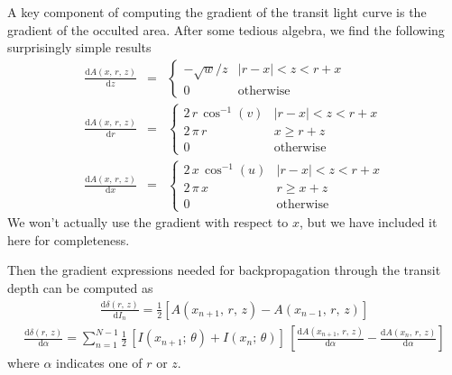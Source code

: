 \documentclass[modern]{aastex62}
\newcommand{\dd}{\ensuremath{ \mathrm{d}}}
\begin{document}
A key component of computing the gradient of the transit light curve is the
gradient of the occulted area.
After some tedious algebra, we find the following surprisingly simple results
\begin{eqnarray}
\frac{\dd A(x,\,r,\,z)}{\dd z} &=& \left\{\begin{array}{ll}
-\sqrt{w}/z &
    \left|r-x\right| < z < r + x \\
0 & \mathrm{otherwise}
\end{array}\right.\\
\frac{\dd A(x,\,r,\,z)}{\dd r} &=& \left\{\begin{array}{ll}
2\,r\,\cos^{-1}(v) & \left|r-x\right| < z < r + x \\
2\,\pi\,r & x \ge r + z \\
0 & \mathrm{otherwise}
\end{array}\right.\\
\frac{\dd A(x,\,r,\,z)}{\dd x} &=& \left\{\begin{array}{ll}
2\,x\,\cos^{-1}(u) & \left|r-x\right| < z < r + x \\
2\,\pi\,x & r \ge x + z \\
0 & \mathrm{otherwise}
\end{array}\right.
\end{eqnarray}
We won't actually use the gradient with respect to $x$, but we have included
it here for completeness.

Then the gradient expressions needed for backpropagation through the transit
depth can be computed as
\begin{eqnarray}
\frac{\dd \delta(r,\,z)}{\dd I_n} = \frac{1}{2}
    \left[A(x_{n+1},\,r,\,z) - A(x_{n-1},\,r,\,z)\right]
\end{eqnarray}
\begin{eqnarray}
\frac{\dd \delta(r,\,z)}{\dd \alpha} = \sum_{n=1}^{N-1} \frac{1}{2}\,\left[
I(x_{n+1};\,\theta) + I(x_n;\,\theta)\right]\,
\left[\frac{\dd A(x_{n+1},\,r,\,z)}{\dd\alpha} -
\frac{\dd A(x_n,\,r,\,z)}{\dd \alpha}\right]
\end{eqnarray}
where $\alpha$ indicates one of $r$ or $z$.



\end{document}
